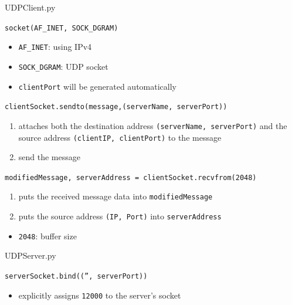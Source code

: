 \begin{frame}[t,allowframebreaks]{UDPClient.py}
  \begin{center}
  \end{center}
  \begin{iblock}{\texttt{socket(AF\_INET, SOCK\_DGRAM)}}
    \begin{itemize}
    \item \texttt{AF\_INET}: using IPv4
    \item \texttt{SOCK\_DGRAM}: UDP socket
    \item \texttt{clientPort} will be generated automatically
    \end{itemize}
  \end{iblock}
  \begin{iblock}{\texttt{clientSocket.sendto(message,(serverName, serverPort))}}
    \begin{enumerate}
    \item attaches both the destination address \texttt{(serverName, serverPort)} and the
      source address \texttt{(clientIP, clientPort)} to the message
    \item send the message
    \end{enumerate}
  \end{iblock}
  \begin{iblock}{\texttt{modifiedMessage, serverAddress = clientSocket.recvfrom(2048)}}
    \begin{enumerate}
    \item puts the received message data into \texttt{modifiedMessage}
    \item puts the source address \texttt{(IP, Port)} into \texttt{serverAddress}
    \end{enumerate}
    \begin{itemize}
    \item \texttt{2048}: buffer size
    \end{itemize}
  \end{iblock}
\end{frame}

\begin{frame}{UDPServer.py}
  \begin{center}
  \end{center}
  \begin{iblock}{\texttt{serverSocket.bind(('', serverPort))}}
    \begin{itemize}
    \item explicitly assigns \texttt{12000} to the server's socket
    \end{itemize}
  \end{iblock}
\end{frame}

